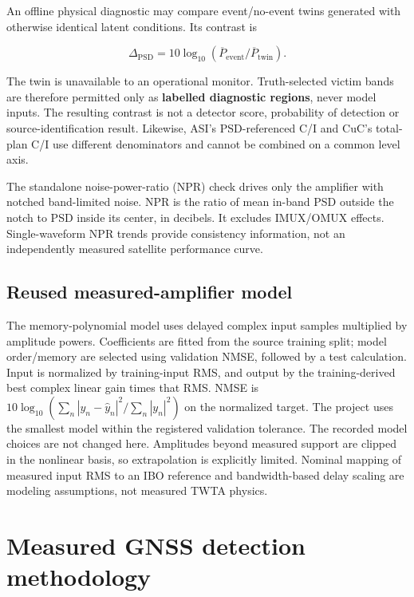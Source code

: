 \documentclass[
  10pt,
]{article}
\begin{document}
An offline physical diagnostic may compare event/no-event twins
generated with otherwise identical latent conditions. Its contrast is

\[\Delta_{\mathrm{PSD}}=10\log_{10}\!\left(\overline{P}_{\mathrm{event}}/\overline{P}_{\mathrm{twin}}\right).\]

The twin is unavailable to an operational monitor. Truth-selected victim
bands are therefore permitted only as \textbf{labelled diagnostic
regions}, never model inputs. The resulting contrast is not a detector
score, probability of detection or source-identification result.
Likewise, ASI's PSD-referenced C/I and CuC's total-plan C/I use
different denominators and cannot be combined on a common level axis.

The standalone noise-power-ratio (NPR) check drives only the amplifier
with notched band-limited noise. NPR is the ratio of mean in-band PSD
outside the notch to PSD inside its center, in decibels. It excludes
IMUX/OMUX effects. Single-waveform NPR trends provide consistency
information, not an independently measured satellite performance curve.

\subsection{Reused measured-amplifier
model}\label{reused-measured-amplifier-model}

The memory-polynomial model uses delayed complex input samples
multiplied by amplitude powers. Coefficients are fitted from the source
training split; model order/memory are selected using validation NMSE,
followed by a test calculation. Input is normalized by training-input
RMS, and output by the training-derived best complex linear gain times
that RMS. NMSE is \(10\log_{10}(\sum_n|y_n-\hat y_n|^2/\sum_n|y_n|^2)\)
on the normalized target. The project uses the smallest model within the
registered validation tolerance. The recorded model choices are not
changed here. Amplitudes beyond measured support are clipped in the
nonlinear basis, so extrapolation is explicitly limited. Nominal mapping
of measured input RMS to an IBO reference and bandwidth-based delay
scaling are modeling assumptions, not measured TWTA physics.

\section{Measured GNSS detection
methodology}\label{measured-gnss-detection-methodology}
\end{document}
